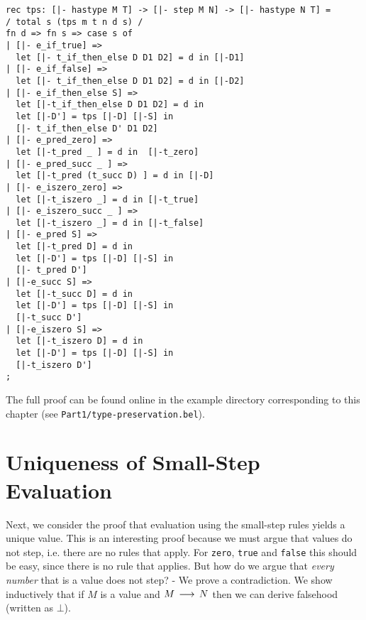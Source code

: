 \begin{lstlisting}
rec tps: [|- hastype M T] -> [|- step M N] -> [|- hastype N T] =
/ total s (tps m t n d s) /
fn d => fn s => case s of
| [|- e_if_true] =>
  let [|- t_if_then_else D D1 D2] = d in [|-D1]
| [|- e_if_false] =>
  let [|- t_if_then_else D D1 D2] = d in [|-D2]
| [|- e_if_then_else S] =>
  let [|-t_if_then_else D D1 D2] = d in
  let [|-D'] = tps [|-D] [|-S] in
  [|- t_if_then_else D' D1 D2]
| [|- e_pred_zero] =>
  let [|-t_pred _ ] = d in  [|-t_zero]
| [|- e_pred_succ _ ] =>
  let [|-t_pred (t_succ D) ] = d in [|-D]
| [|- e_iszero_zero] =>
  let [|-t_iszero _] = d in [|-t_true]
| [|- e_iszero_succ _ ] =>
  let [|-t_iszero _] = d in [|-t_false]
| [|- e_pred S] =>
  let [|-t_pred D] = d in
  let [|-D'] = tps [|-D] [|-S] in
  [|- t_pred D']
| [|-e_succ S] =>
  let [|-t_succ D] = d in
  let [|-D'] = tps [|-D] [|-S] in
  [|-t_succ D']
| [|-e_iszero S] =>
  let [|-t_iszero D] = d in
  let [|-D'] = tps [|-D] [|-S] in
  [|-t_iszero D']
;
\end{lstlisting}

The full proof can be found online in the example directory corresponding to
this chapter (see \verb|Part1/type-preservation.bel|).

\section{Uniqueness of Small-Step Evaluation}\label{sec:unique-eval}

Next, we consider the proof that evaluation using the small-step rules yields a
unique value. This is an interesting proof because we must argue that values do
not step, i.e. there are no rules that apply. For \lstinline!zero!,
\lstinline!true! and \lstinline!false! this should be easy, since there is no
rule that applies. But how do we argue that \emph{every number} that is a value
does not step? - We prove a contradiction. We show inductively that if $M$ is a
value and $M \mathrel{\,\longrightarrow\,} N$ then we can derive falsehood
(written as $\bot$).

